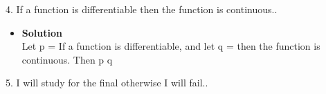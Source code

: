 \documentclass[11pt]{article}
\begin{document}


\begin{flushleft}
{\large 4. If a function is differentiable then the function is continuous..}
\end{flushleft}



\begin{itemize}

\item \textbf{Solution}\\
Let p = If a function is differentiable, and let q = then the function is continuous. 
Then p  q \\



\end{itemize}




\begin{flushleft}
{\large 5.  I will study for the final otherwise I will fail..}
\end{flushleft}
\end{document}
